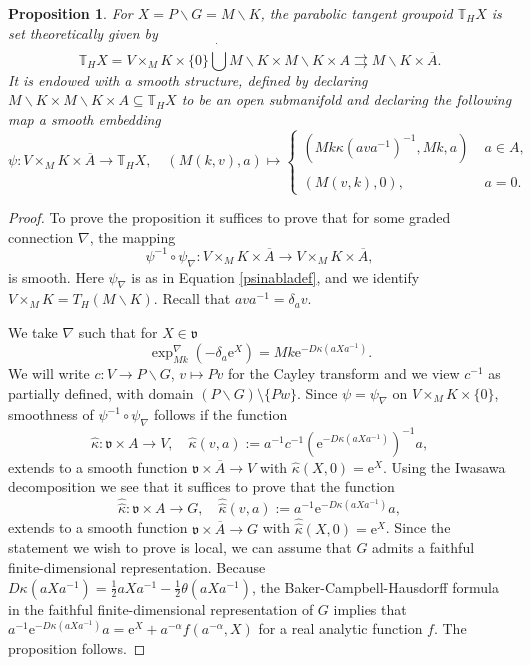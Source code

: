 \documentclass[a4paper,reqno]{amsart}
\numberwithin{equation}{section}
\newtheorem{prop}[thm]{Proposition}
\theoremstyle{definition}
\theoremstyle{remark}
\begin{document}
\begin{prop}
\label{lknadlnad}
For $X=P\backslash G=M\backslash K$, the parabolic tangent groupoid $\mathbb{T}_HX$ is set theoretically given by
$$\mathbb{T}_HX=V\times_M K\times \{0\}\dot{\bigcup} M\backslash K\times M\backslash K\times A\rightrightarrows M\backslash K \times \overline{A}.$$
It is endowed with a smooth structure, defined by declaring $M\backslash K\times M\backslash K\times A\subseteq \mathbb{T}_HX$ to be an open submanifold and declaring the following map a smooth embedding 
$$\psi:V\times_M K\times \overline{A}\to \mathbb{T}_HX, 
\quad 
(M(k,v),a)\mapsto\begin{cases}
(Mk\kappa(ava^{-1})^{-1},Mk,a)\; &a\in A,\\
{}\\
(M(v,k),0),\; &a=0.
\end{cases}$$
\end{prop}

\begin{proof}
To prove the proposition it suffices to prove that for some graded connection $\nabla$, the mapping
$$\psi^{-1}\circ \psi_\nabla:V\times_M K\times \overline{A}\to V\times_M K\times \overline{A},$$ 
is smooth. Here $\psi_\nabla$ is as in Equation \eqref{psinabladef}, and we identify $V\times_M K=T_H(M\backslash K)$. Recall that $ava^{-1}=\delta_av$. 

We take $\nabla$ such that for $X\in \mathfrak{v}$
$$\exp_{Mk}^\nabla(-\delta_a\mathrm{e}^{X})= Mk\mathrm{e}^{-D\kappa(aXa^{-1})}.$$
We will write $c:V\to P\backslash G$, $v\mapsto Pv$ for the Cayley transform and we view $c^{-1}$ as partially defined, with domain $(P\backslash G)\setminus \{Pw\}$. Since $\psi=\psi_\nabla$ on $V\times_M K\times\{0\}$, smoothness of $\psi^{-1}\circ \psi_\nabla$ follows if the function 
$$\hat{\kappa}:\mathfrak{v}\times A\to V, \quad \hat{\kappa}(v,a):= a^{-1}c^{-1}(\mathrm{e}^{-D\kappa(aXa^{-1})})^{-1}a,$$
extends to a smooth function $\mathfrak{v}\times \overline{A}\to V$ with $\hat{\kappa}(X,0)=\mathrm{e}^{X}$. Using the Iwasawa decomposition we see that it suffices to prove that the function 
$$\hat{\hat{\kappa}}:\mathfrak{v}\times A\to G, \quad \hat{\hat{\kappa}}(v,a):= a^{-1}\mathrm{e}^{-D\kappa(aXa^{-1})}a,$$
extends to a smooth function $\mathfrak{v}\times \overline{A}\to G$ with $\hat{\hat{\kappa}}(X,0)=\mathrm{e}^{X}$. Since the statement we wish to prove is local, we can assume that $G$ admits a faithful finite-dimensional representation. Because $D\kappa(aXa^{-1})=\frac{1}{2}aXa^{-1}-\frac{1}{2}\theta(aXa^{-1})$, the Baker-Campbell-Hausdorff formula in the faithful finite-dimensional representation of $G$ implies that $a^{-1}\mathrm{e}^{-D\kappa(aXa^{-1})}a=\mathrm{e}^X+a^{-\alpha}f(a^{-\alpha},X)$ for a real analytic function $f$. The proposition follows. 
\end{proof}
\end{document}
